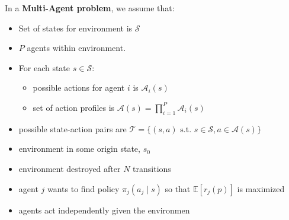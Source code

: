 \begin{summary}
    In a \textbf{Multi-Agent problem}, we assume that:
    \begin{itemize}
        \item Set of states for environment is $\mathcal{S}$
        \item $P$ agents within environment. 
        \item For each state $s \in \mathcal{S}$: 
        \begin{itemize}
            \item possible actions for agent $i$ is $\mathcal{A}_i(s)$
            \item set of action profiles is $\mathcal{A}(s) = \prod_{i=1}^P \mathcal{A}_i(s)$
        \end{itemize}
        \item possible state-action pairs are $\mathcal{T} = \{(s,a) \text{ s.t. } s \in \mathcal{S}, a \in \mathcal{A}(s)\}$
        \item environment in some origin state, $s_0$ 
        \item environment destroyed after $N$ transitions 
        \item agent $j$ wants to find policy $\pi_j (a_j \mid s)$ so that $\mathbb{E}[r_j(p)]$ is maximized
        \item agents act independently given the environmen
    \end{itemize}


\end{summary}

